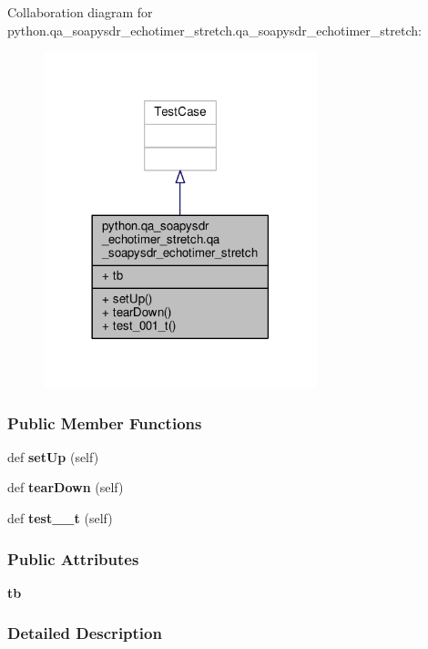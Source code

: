 Collaboration diagram for python.\+qa\+\_\+soapysdr\+\_\+echotimer\+\_\+stretch.\+qa\+\_\+soapysdr\+\_\+echotimer\+\_\+stretch\+:
\nopagebreak
\begin{figure}[H]
\begin{center}
\leavevmode
\includegraphics[width=225pt]{d7/de4/classpython_1_1qa__soapysdr__echotimer__stretch_1_1qa__soapysdr__echotimer__stretch__coll__graph}
\end{center}
\end{figure}
\subsubsection*{Public Member Functions}
\begin{DoxyCompactItemize}
\item 
def {\bf set\+Up} (self)
\item 
def {\bf tear\+Down} (self)
\item 
def {\bf test\+\_\+\_\+t} (self)
\end{DoxyCompactItemize}
\subsubsection*{Public Attributes}
\begin{DoxyCompactItemize}
\item 
{\bf tb}
\end{DoxyCompactItemize}


\subsubsection{Detailed Description}


